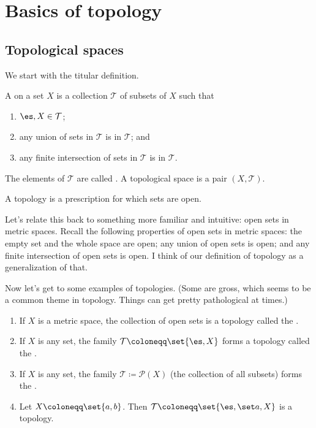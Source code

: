 \documentclass[class=article, crop=false]{standalone}
\begin{document}
\section{Basics of topology}

\subsection{Topological spaces}

We start with the titular definition.
\begin{defn}[Topology]
  A  on a set $X$ is a collection $\mathcal T$ of subsets of $X$ such that
    \begin{enumerate}[(1)]
      \item $\es, X \in \mathcal T$;
      \item any union of sets in $\mathcal T$ is in $\mathcal T$; and
      \item any finite intersection of sets in $\mathcal T$ is in $\mathcal T$.
    \end{enumerate}
  The elements of $\mathcal T$ are called . A topological space is a pair $(X,\mathcal T)$.
\end{defn}
\begin{rem}
  A topology is a prescription for which sets are open.
\end{rem}

Let's relate this back to something more familiar and intuitive: open sets in metric spaces. Recall the following properties of open sets in metric spaces: the empty set and the whole space are open; any union of open sets is open; and any finite intersection of open sets is open. I think of our definition of topology as a generalization of that.

Now let's get to some examples of topologies. (Some are gross, which seems to be a common theme in topology. Things can get pretty pathological at times.)

\begin{ex} \ldr
  \begin{enumerate}[(1)]
    \item If $X$ is a metric space, the collection of open sets is a topology called the .

    \item If $X$ is any set, the family $\mathcal T \coloneqq \set{\es, X}$ forms a topology called the .

    \item If $X$ is any set, the family $\mathcal T \coloneqq \mathcal P (X)$ (the collection of all subsets) forms the .

    \item Let $X \coloneqq \set{a,b}$. Then $\mathcal T \coloneqq \set{\es, \set a, X}$ is a topology.
  \end{enumerate}
\end{ex}
\end{document}
